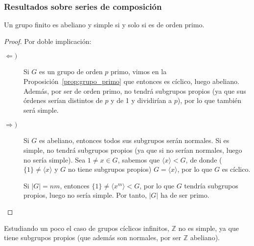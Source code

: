 \subsubsection{Resultados sobre series de composición}
\begin{prop}\label{prop:carac_simples_abelianos}
    Un grupo finito es abeliano y simple si y solo si es de orden primo.
    \begin{proof}
        Por doble implicación:
        \begin{description}
            \item [$\Longleftarrow)$] Si $G$ es un grupo de orden $p$ primo, vimos en la Proposición~\ref{prop:grupo_primo} que entonces es cíclico, luego abeliano. Además, por ser de orden primo, no tendrá subgrupos propios (ya que sus órdenes serían distintos de $p$ y de 1 y dividirían a $p$), por lo que también será simple.
            \item [$\Longrightarrow)$] Si $G$ es abeliano, entonces todos sus subgrupos serán normales. Si es simple, no tendrá subgrupos propios (ya que si no serían normales, luego no sería simple). Sea $1\neq x\in G$, sabemos que $\langle x \rangle < G$, de donde ($\{1\}\neq \langle x \rangle $ y $G$ no tiene subgrupos propios) $G = \langle x \rangle $, por lo que $G$ es cíclico. 

                Si $|G| = nm$, entonces $\{1\}\neq \langle x^m \rangle < G$, por lo que $G$ tendría subgrupos propios, luego no sería simple. Por tanto, $|G|$ ha de ser primo.
        \end{description}
    \end{proof}
\end{prop}

\begin{ejemplo}
    Estudiando un poco el caso de grupos cíclicos infinitos, $\mathbb{Z}$ no es simple, ya que tiene subgrupos propios (que además son normales, por ser $\mathbb{Z}$ abeliano).
\end{ejemplo}

